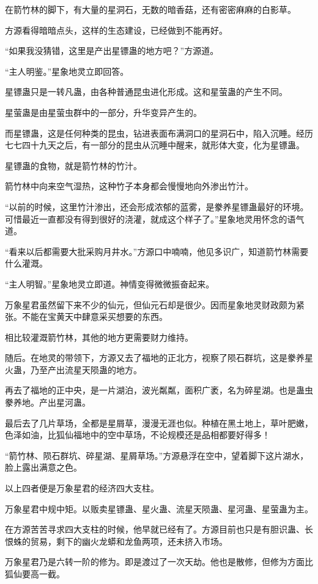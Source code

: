 \begin{this_body}
在箭竹林的脚下，有大量的星洞石，无数的暗香菇，还有密密麻麻的白影草。

方源看得暗暗点头，这样的生态建设，已经做到不能再好。

“如果我没猜错，这里是产出星镖蛊的地方吧？”方源道。

“主人明鉴。”星象地灵立即回答。

星镖蛊只是一转凡蛊，由各种普通昆虫进化形成。这和星萤蛊的产生不同。

星萤蛊是由星萤虫群中的一部分，升华变异产生的。

而星镖蛊，这是任何种类的昆虫，钻进表面布满洞口的星洞石中，陷入沉睡。经历七七四十九天之后，有一部分的昆虫从沉睡中醒来，就形体大变，化为星镖蛊。

星镖蛊的食物，就是箭竹林的竹汁。

箭竹林中向来空气湿热，这种竹子本身都会慢慢地向外渗出竹汁。

“以前的时候，这里竹汁渗出，还会形成浓郁的蓝雾，是豢养星镖蛊最好的环境。可惜最近一直都没有得到很好的浇灌，就成这个样子了。”星象地灵用怀念的语气道。

“看来以后都需要大批采购月井水。”方源口中喃喃，他见多识广，知道箭竹林需要什么灌溉。

“主人明智。”星象地灵立即道。神情变得微微振奋起来。

万象星君虽然留下来不少的仙元，但仙元石却是很少。因而星象地灵财政颇为紧张。不能在宝黄天中肆意采买想要的东西。

相比较灌溉箭竹林，其他的地方更需要财力维持。

随后。在地灵的带领下，方源又去了福地的正北方，视察了陨石群坑，这是豢养星火蛊，乃至产出流星天陨蛊的地方。

再去了福地的正中央，是一片湖泊，波光粼粼，面积广袤，名为碎星湖。也是蛊虫豢养地。产出星河蛊。

最后去了几片草场，全都是星屑草，漫漫无涯也似。种植在黑土地上，草叶肥嫩，色泽如油，比狐仙福地中的空中草场，不论规模还是品相都要好得多！

“箭竹林、陨石群坑、碎星湖、星屑草场。”方源悬浮在空中，望着脚下这片湖水，脸上露出满意之色。

以上四者便是万象星君的经济四大支柱。

万象星君中规中矩。以贩卖星镖蛊、星火蛊、流星天陨蛊、星河蛊、星萤蛊为主。

在方源苦苦寻求四大支柱的时候，他早就已经有了。方源目前也只是有胆识蛊、长恨蛛的贸易，剩下的幽火龙蟒和龙鱼两项，还未挤入市场。

万象星君乃是六转一阶的修为。即是渡过了一次天劫。他也是散修，但修为方面比狐仙要高一截。


\end{this_body}
